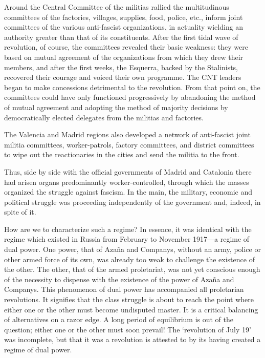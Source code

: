 Around the Central Committee of the militias rallied the multitudinous committees of the factories, villages, supplies, food, police, etc., inform joint committees of the various anti-fascist organizations, in actuality wielding an authority greater than that of its constituents. After the first tidal wave of revolution, of course, the committees revealed their basic weakness: they were based on mutual agreement of the organizations from which they drew their members, and after the first weeks, the Esquerra, backed by the Stalinists, recovered their courage and voiced their own programme. The CNT leaders began to make concessions detrimental to the revolution. From that point on, the committees could have only functioned progressively by abandoning the method of mutual agreement and adopting the method of majority decisions by democratically elected delegates from the militias and factories.

The Valencia and Madrid regions also developed a network of anti-fascist joint militia committees, worker-patrols, factory committees, and district committees to wipe out the reactionaries in the cities and send the militia to the front.

Thus, side by side with the official governments of Madrid and Catalonia there had arisen organs predominantly worker-controlled, through which the masses organized the struggle against fascism. In the main, the military, economic and political struggle was proceeding independently of the government and, indeed, in spite of it.

How are we to characterize such a regime? In essence, it was identical with the regime which existed in Russia from February to November 1917---a regime of dual power. One power, that of Azaña and Companys, without an army, police or other armed force of its own, was already too weak to challenge the existence of the other. The other, that of the armed proletariat, was not yet conscious enough of the necessity to dispense with the existence of the power of Azaña and Companys. This phenomenon of dual power has accompanied all proletarian revolutions. It signifies that the class struggle is about to reach the point where either one or the other must become undisputed master. It is a critical balancing of alternatives on a razor edge. A long period of equilibrium is out of the question; either one or the other must soon prevail! The `revolution of July 19' was incomplete, but that it was a revolution is attested to by its having created a regime of dual power.